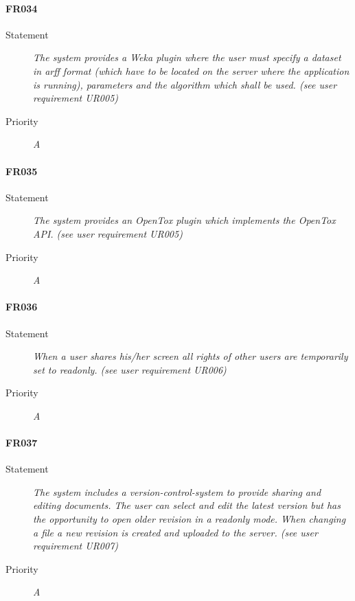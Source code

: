 \paragraph{FR034}
\begin{description}
  \item[Statement]
    \textit{The system provides a Weka plugin where the user must
      specify a dataset in arff format (which have to be located on
      the server where the application is running), parameters and the
      algorithm which shall be used. (see user requirement UR005)}
  \item[Priority]
    \textit{A}
\end{description}


\paragraph{FR035}
\begin{description}
  \item[Statement]
    \textit{The system provides an OpenTox plugin which implements the OpenTox \gls{API}. (see user requirement UR005)}
  \item[Priority]
    \textit{A}
\end{description}


\paragraph{FR036}
\begin{description}
  \item[Statement]
    \textit{When a user shares his/her screen all rights of other users are temporarily set to readonly. (see user requirement UR006)}
  \item[Priority]
    \textit{A}
\end{description}


\paragraph{FR037}
\begin{description}
  \item[Statement]
    \textit{The system includes a version-control-system to provide sharing and editing documents. The user can select and edit the latest version but has the opportunity to open older revision in a readonly mode. When changing a file a new revision is created and uploaded to the server. (see user requirement UR007)}
  \item[Priority]
    \textit{A}
\end{description}

